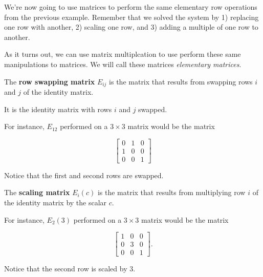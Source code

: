 \documentclass{ximera}
\begin{document}
\begin{exploration}
\begin{example}
\begin{remark}

  We're now going to use matrices to perform the same elementary row operations from the previous example. Remember that we solved the system by 1) replacing one row with another, 2) scaling one row, and 3) adding a multiple of one row to another.

  As it turns out, we can use matrix multiplcation to use perform these same manipulations to matrices. We will call these matrices \emph{elementary matrices}.

  \begin{definition}
    The \textbf{row swapping matrix} $E_{ij}$ is the matrix that results from swapping rows $i$ and $j$ of the identity matrix.

    It is the identity matrix with rows $i$ and $j$ swapped.

    For instance, $E_{12}$ performed on a $3\times 3$ matrix would be the matrix

    \begin{equation*}
      \begin{bmatrix}
        0 & 1 & 0 \\
        1 & 0 & 0 \\
        0 & 0 & 1
      \end{bmatrix}
    \end{equation*}

    Notice that the first and second rows are swapped.
  \end{definition}

  \begin{definition}
    The \textbf{scaling matrix} $E_{i}(c)$ is the matrix that results from multiplying row $i$ of the identity matrix by the scalar $c$.

    For instance, $E_{2}(3)$ performed on a $3\times 3$ matrix would be the matrix

    \begin{equation*}
      \begin{bmatrix}
        1 & 0 & 0 \\
        0 & 3 & 0 \\
        0 & 0 & 1
      \end{bmatrix}.
    \end{equation*}

    Notice that the second row is scaled by $3$.
  \end{definition}


\end{remark}
\end{example}
\end{exploration}
\end{document}

